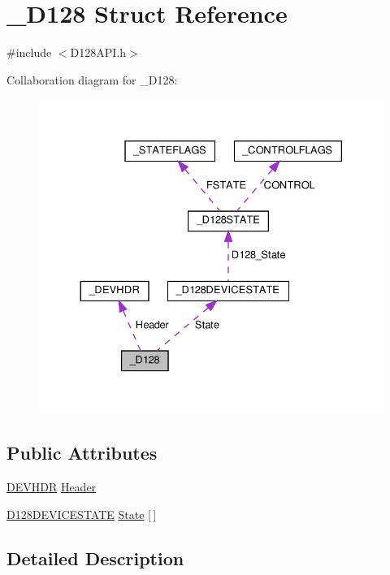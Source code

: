 \hypertarget{struct___d128}{}\section{\+\_\+\+D128 Struct Reference}
\label{struct___d128}


{\ttfamily \#include $<$D128\+A\+P\+I.\+h$>$}



Collaboration diagram for \+\_\+\+D128\+:
\nopagebreak
\begin{figure}[H]
\begin{center}
\leavevmode
\includegraphics[width=330pt]{struct___d128__coll__graph}
\end{center}
\end{figure}
\subsection*{Public Attributes}
\begin{DoxyCompactItemize}
\item 
\hyperlink{_d128_a_p_i_8h_ac4f7ac6f5a50549a97c064894bdcf244}{D\+E\+V\+H\+DR} \hyperlink{struct___d128_a8348c7adb2ef3954c978112fe8b71785}{Header}
\item 
\hyperlink{_d128_a_p_i_8h_aec4b5617f0e6a151d0388c3c6f61c199}{D128\+D\+E\+V\+I\+C\+E\+S\+T\+A\+TE} \hyperlink{struct___d128_acad147b63666e9259067b464075e47d4}{State} \mbox{[}$\,$\mbox{]}
\end{DoxyCompactItemize}


\subsection{Detailed Description}


